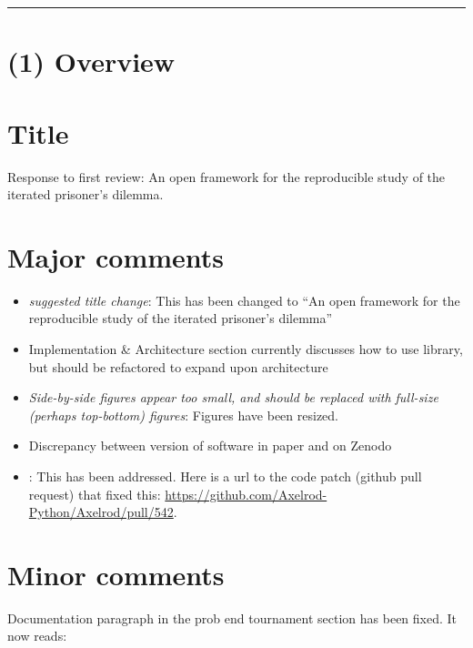 \documentclass{jors}
\renewcommand\headrule{}
\begin{document}
\pagestyle{fancy}
\renewcommand\headrule{}
\rhead{\textcolor{gray}{UP JORS software Latex paper template version 0.1}}

\rule{\textwidth}{1pt}

\section*{(1) Overview}\label{sec:sec:overview}

\vspace{0.5cm}

\section*{Title}

Response to first review: An open framework for the reproducible study of the
iterated prisoner's dilemma.

\section*{Major comments}


\begin{itemize}
\item \textit{suggested title change}: This has been changed to ``An open framework for
      the reproducible study of the iterated prisoner's dilemma''
\item Implementation & Architecture section currently discusses how to use library, but should be refactored to expand upon architecture
\item \textit{Side-by-side figures appear too small, and should be replaced with full-size (perhaps top-bottom) figures}: Figures have been resized.
\item Discrepancy between version of software in paper and on Zenodo
\item {}: This has been addressed. Here is a url to the code patch (github pull request) that fixed this: \url{https://github.com/Axelrod-Python/Axelrod/pull/542}.
\end{itemize}

\section*{Minor comments}

Documentation paragraph in the prob end tournament section has been fixed. It now reads:
\end{document}
